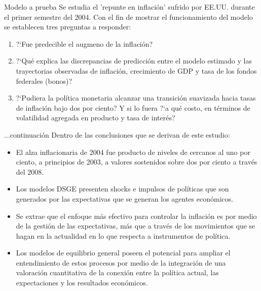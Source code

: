 \documentclass{beamer}
\begin{document}
\begin{frame}{Modelo a prueba}
Se estudia el 'repunte en inflaci\'on' sufrido por EE.UU. durante el primer semestre del 2004. Con el fin de mostrar el funcionamiento del modelo se establecen tres preguntas a responder:
\begin{enumerate}
\item{?`Fue predecible el augmeno de la inflaci\'on?}
\item{?`Qu\'e explica las discrepancias de predicci\'on entre el modelo estimado y las trayectorias observadas de inflaci\'on, crecimiento de GDP y tasa de los fondos federales (bonos)?}
\item{?`Pudiera la pol\'itica monetaria alcanzar una transici\'on suavizada hacia tasas de inflaci\'on bajo dos por ciento? Y si lo fuera ?`a qu\'e costo, en t\'erminos de volatilidad agregada en producto y tasa de inter\'es? }
\end{enumerate}
\end{frame}

\begin{frame}{...continuaci\'on}
Dentro de las conclusiones que se derivan de este estudio:
\begin{itemize}
\item{El alza inflacionaria de 2004 fue producto de niveles de cercanos al uno por ciento, a principios de 2003, a valores sostenidos sobre dos por ciento a trav\'es del 2008.}
\item{Los modelos DSGE presenten shocks e impulsos de pol\'iticas que son generados por las expectativas que se generan los agentes econ\'omicos.}
\item{Se extrae que el enfoque m\'as efectivo para controlar la inflaci\'on es por medio de la gesti\'on de las expectativas, m\'as que a trav\'es de los movimientos que se hagan en la actualidad en lo que respecta a instrumentos de pol\'itica.}
\item{Los modelos de equilibrio general poseen el potencial para ampliar el entendimiento de estos procesos por medio de la integraci\'on de una valoraci\'on cuantitativa de la conexi\'on entre la pol\'itica actual, las expectaciones y los resultados econ\'omicos.}
\end{itemize}

\end{frame}
\end{document}
